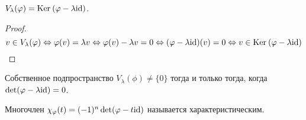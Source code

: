 \begin{Suggestion}
$V_\lambda(\varphi) = \mathrm{Ker}\:(\varphi - \lambda\mathrm{id})$.
\end{Suggestion}
\begin{proof}
    $$
    v \in V_{\lambda}(\varphi) \Leftrightarrow \varphi(v) = \lambda v \Leftrightarrow \varphi(v) - \lambda v = 0 \Leftrightarrow (\varphi - \lambda \mathrm{id})(v) = 0  \Leftrightarrow v \in \mathrm{Ker}\:(\varphi - \lambda \mathrm{id})
    $$
\end{proof}
\begin{Consequence}
    Собственное подпространство $V_{\lambda}(\phi) \neq \{0\}$ тогда и только тогда, когда \\$\det(\varphi - \lambda \mathrm{id}) = 0$.
\end{Consequence}
\begin{Def}
    Многочлен $\chi_{\varphi}(t) = (-1)^n\det(\varphi - t \mathrm{id})$ называется характеристическим.
\end{Def}

